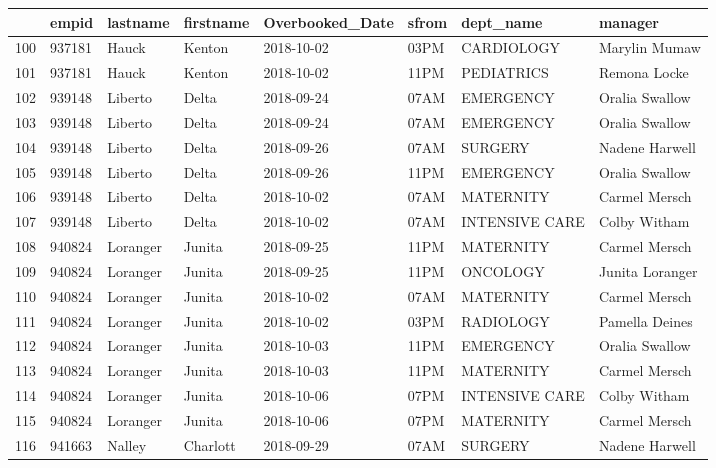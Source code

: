 \documentclass[11pt]{article}
\begin{document}
\begin{tabular}{|l|l|l|l|l|l|l|l|}
	\toprule
	{} &   empid &  lastname & firstname & Overbooked\_Date & sfrom &       dept\_name &          manager \\
	\midrule
	100 &  937181 &     Hauck &    Kenton &      2018-10-02 &  03PM &      CARDIOLOGY &    Marylin Mumaw \\
	101 &  937181 &     Hauck &    Kenton &      2018-10-02 &  11PM &      PEDIATRICS &     Remona Locke \\
	102 &  939148 &   Liberto &     Delta &      2018-09-24 &  07AM &       EMERGENCY &   Oralia Swallow \\
	103 &  939148 &   Liberto &     Delta &      2018-09-24 &  07AM &       EMERGENCY &   Oralia Swallow \\
	104 &  939148 &   Liberto &     Delta &      2018-09-26 &  07AM &         SURGERY &   Nadene Harwell \\
	105 &  939148 &   Liberto &     Delta &      2018-09-26 &  11PM &       EMERGENCY &   Oralia Swallow \\
	106 &  939148 &   Liberto &     Delta &      2018-10-02 &  07AM &       MATERNITY &    Carmel Mersch \\
	107 &  939148 &   Liberto &     Delta &      2018-10-02 &  07AM &  INTENSIVE CARE &     Colby Witham \\
	108 &  940824 &  Loranger &    Junita &      2018-09-25 &  11PM &       MATERNITY &    Carmel Mersch \\
	109 &  940824 &  Loranger &    Junita &      2018-09-25 &  11PM &        ONCOLOGY &  Junita Loranger \\
	110 &  940824 &  Loranger &    Junita &      2018-10-02 &  07AM &       MATERNITY &    Carmel Mersch \\
	111 &  940824 &  Loranger &    Junita &      2018-10-02 &  03PM &       RADIOLOGY &   Pamella Deines \\
	112 &  940824 &  Loranger &    Junita &      2018-10-03 &  11PM &       EMERGENCY &   Oralia Swallow \\
	113 &  940824 &  Loranger &    Junita &      2018-10-03 &  11PM &       MATERNITY &    Carmel Mersch \\
	114 &  940824 &  Loranger &    Junita &      2018-10-06 &  07PM &  INTENSIVE CARE &     Colby Witham \\
	115 &  940824 &  Loranger &    Junita &      2018-10-06 &  07PM &       MATERNITY &    Carmel Mersch \\
	116 &  941663 &    Nalley &  Charlott &      2018-09-29 &  07AM &         SURGERY &   Nadene Harwell \\

\end{tabular}
\end{document}
